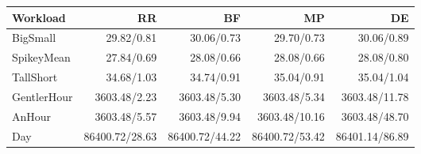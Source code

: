\begin{tabular}{lrrrr}
\toprule
Workload & RR & BF & MP & DE \\
\midrule
BigSmall & 29.82/0.81 & 30.06/0.73 & 29.70/0.73 & 30.06/0.89 \\
SpikeyMean & 27.84/0.69 & 28.08/0.66 & 28.08/0.66 & 28.08/0.80 \\
TallShort & 34.68/1.03 & 34.74/0.91 & 35.04/0.91 & 35.04/1.04 \\
GentlerHour & 3603.48/2.23 & 3603.48/5.30 & 3603.48/5.34 & 3603.48/11.78 \\
AnHour & 3603.48/5.57 & 3603.48/9.94 & 3603.48/10.16 & 3603.48/48.70 \\
Day & 86400.72/28.63 & 86400.72/44.22 & 86400.72/53.42 & 86401.14/86.89 \\
\bottomrule
\end{tabular}
